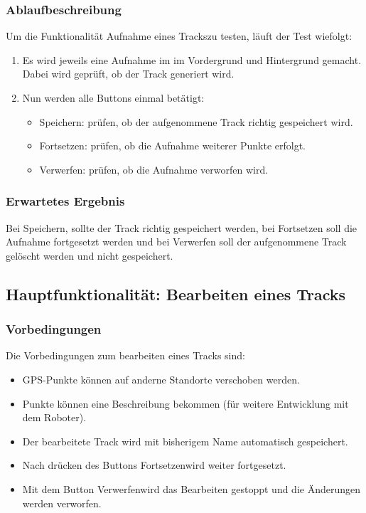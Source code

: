 \documentclass{article}
\begin{document}
\subsubsection{Ablaufbeschreibung}
	Um die Funktionalität \glqq Aufnahme eines Tracks\grqq\space zu testen, läuft der Test wiefolgt:
	\begin{enumerate}
		\item Es wird jeweils eine Aufnahme im im Vordergrund und Hintergrund gemacht. Dabei wird geprüft, ob der Track generiert wird.
		\item Nun werden alle Buttons einmal betätigt:
			\begin{itemize}
				\item Speichern: prüfen, ob der aufgenommene Track richtig gespeichert wird.
				\item Fortsetzen: prüfen, ob die Aufnahme weiterer Punkte erfolgt.
				\item Verwerfen: prüfen, ob die Aufnahme verworfen wird.
			\end{itemize}
	\end{enumerate}
\subsubsection{Erwartetes Ergebnis}
	Bei Speichern, sollte der Track richtig gespeichert werden, bei Fortsetzen soll die Aufnahme fortgesetzt werden und bei Verwerfen soll der aufgenommene Track gelöscht werden und nicht gespeichert.

\subsection{Hauptfunktionalität: Bearbeiten eines Tracks}
\subsubsection{Vorbedingungen}
	Die Vorbedingungen zum bearbeiten eines Tracks sind:
	\begin{itemize}
		\item GPS-Punkte können auf anderne Standorte verschoben werden.
		\item Punkte können eine Beschreibung bekommen (für weitere Entwicklung mit dem Roboter).
		\item Der bearbeitete Track wird mit bisherigem Name automatisch gespeichert.
		\item Nach drücken des Buttons \glqq Fortsetzen\grqq\space wird weiter fortgesetzt.
		\item Mit dem Button \glqq Verwerfen\grqq\space wird das Bearbeiten gestoppt und die Änderungen werden verworfen.		
	\end{itemize}
\end{document}
